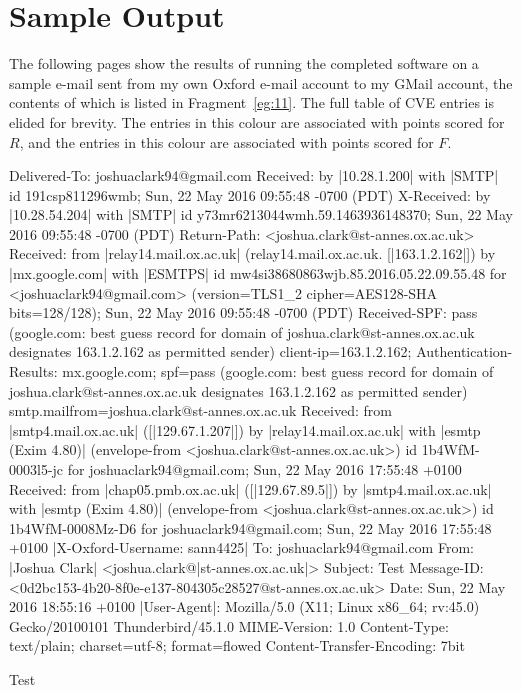 \section{Sample Output}

The following pages show the results of running the completed software on a
sample e-mail sent from my own Oxford e-mail account to my GMail account, the
contents of which is listed in Fragment~\ref{eg:11}.  The full table of CVE
entries is elided for brevity.  The entries in \colorbox{red!30}{this colour}
are associated with points scored for $R$, and the entries in
\colorbox{blue!30}{this colour} are associated with points scored for $F$.

\begin{example}[caption=Sample E-Mail,label=eg:11]
Delivered-To: joshuaclark94@gmail.com
Received: by |\colorbox{red!30}{10.28.1.200}| with |\colorbox{red!30}{SMTP}| id 191csp811296wmb;
        Sun, 22 May 2016 09:55:48 -0700 (PDT)
X-Received: by |\colorbox{red!30}{10.28.54.204}| with |\colorbox{red!30}{SMTP}| id y73mr6213044wmh.59.1463936148370;
        Sun, 22 May 2016 09:55:48 -0700 (PDT)
Return-Path: <joshua.clark@st-annes.ox.ac.uk>
Received: from |\colorbox{red!30}{relay14.mail.ox.ac.uk}| (relay14.mail.ox.ac.uk. [|\colorbox{red!30}{163.1.2.162}|])
        by |\colorbox{red!30}{mx.google.com}| with |\colorbox{red!30}{ESMTPS}| id mw4si38680863wjb.85.2016.05.22.09.55.48
        for <joshuaclark94@gmail.com>
        (version=TLS1_2 cipher=AES128-SHA bits=128/128);
        Sun, 22 May 2016 09:55:48 -0700 (PDT)
Received-SPF: pass (google.com: best guess record for domain of joshua.clark@st-annes.ox.ac.uk designates 163.1.2.162 as permitted sender) client-ip=163.1.2.162;
Authentication-Results: mx.google.com;
       spf=pass (google.com: best guess record for domain of joshua.clark@st-annes.ox.ac.uk designates 163.1.2.162 as permitted sender) smtp.mailfrom=joshua.clark@st-annes.ox.ac.uk
Received: from |\colorbox{red!30}{smtp4.mail.ox.ac.uk}| ([|\colorbox{red!30}{129.67.1.207}|])
	by |\colorbox{red!30}{relay14.mail.ox.ac.uk}| with |\colorbox{red!30}{esmtp (Exim 4.80)}|
	(envelope-from <joshua.clark@st-annes.ox.ac.uk>) id 1b4WfM-0003l5-jc
	for joshuaclark94@gmail.com; Sun, 22 May 2016 17:55:48 +0100
Received: from |\colorbox{red!30}{chap05.pmb.ox.ac.uk}| ([|\colorbox{red!30}{129.67.89.5}|])
	by |\colorbox{red!30}{smtp4.mail.ox.ac.uk}| with |\colorbox{red!30}{esmtp (Exim 4.80)}|
	(envelope-from <joshua.clark@st-annes.ox.ac.uk>) id 1b4WfM-0008Mz-D6
	for joshuaclark94@gmail.com; Sun, 22 May 2016 17:55:48 +0100
|\colorbox{blue!30}{X-Oxford-Username: sann4425}|
To: joshuaclark94@gmail.com
From: |\colorbox{blue!30}{Joshua Clark}| <joshua.clark@|\colorbox{blue!30}{st-annes.ox.ac.uk}|>
Subject: Test
Message-ID: <0d2bc153-4b20-8f0e-e137-804305c28527@st-annes.ox.ac.uk>
Date: Sun, 22 May 2016 18:55:16 +0100
|\colorbox{blue!30}{User-Agent}|: Mozilla/5.0 (X11; Linux x86_64; rv:45.0) Gecko/20100101
 Thunderbird/45.1.0
MIME-Version: 1.0
Content-Type: text/plain; charset=utf-8; format=flowed
Content-Transfer-Encoding: 7bit

Test
\end{example}

